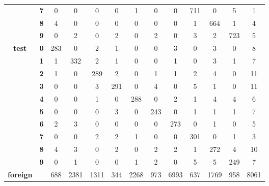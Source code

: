 \begin{table}[htp]
{\begin{tabular}{|c|c|c|c|c|c|c|c|c|c|c|c|c|}
		& \textbf{7} & 0          & 0          & 0          & 0          & 1          & 0          & 0          & 711        & 0          & 5          & 1                \\ \cline{2-13} 
		& \textbf{8} & 4          & 0          & 0          & 0          & 0          & 0          & 0          & 1          & 664        & 1          & 4                \\ \cline{2-13} 
		& \textbf{9} & 0          & 2          & 0          & 2          & 0          & 2          & 0          & 3          & 2          & 723        & 5                \\ \hline
		\multirow{10}{*}{\textbf{test}}     & \textbf{0} & 283        & 0          & 2          & 1          & 0          & 0          & 3          & 0          & 3          & 0          & 8                \\ \cline{2-13} 
		& \textbf{1} & 1          & 332        & 2          & 1          & 0          & 0          & 1          & 0          & 3          & 1          & 7                \\ \cline{2-13} 
		& \textbf{2} & 1          & 0          & 289        & 2          & 0          & 1          & 1          & 2          & 4          & 0          & 11               \\ \cline{2-13} 
		& \textbf{3} & 0          & 0          & 3          & 291        & 0          & 4          & 0          & 5          & 1          & 0          & 11               \\ \cline{2-13} 
		& \textbf{4} & 0          & 0          & 1          & 0          & 288        & 0          & 2          & 1          & 4          & 4          & 6                \\ \cline{2-13} 
		& \textbf{5} & 0          & 0          & 0          & 3          & 0          & 243        & 0          & 1          & 1          & 1          & 7                \\ \cline{2-13} 
		& \textbf{6} & 2          & 3          & 0          & 0          & 0          & 0          & 273        & 0          & 1          & 0          & 5                \\ \cline{2-13} 
		& \textbf{7} & 0          & 0          & 2          & 2          & 1          & 0          & 0          & 301        & 0          & 1          & 3                \\ \cline{2-13} 
		& \textbf{8} & 4          & 3          & 0          & 2          & 0          & 2          & 2          & 1          & 272        & 4          & 10               \\ \cline{2-13} 
		& \textbf{9} & 0          & 1          & 0          & 0          & 1          & 2          & 0          & 5          & 5          & 249        & 7                \\ \hline
		\textbf{foreign}                    & \textbf{}  & 688        & 2381       & 1311       & 344        & 2268       & 973        & 6993       & 637        & 1769       & 958        & 8061             \\ \hline
	\end{tabular}
	}
\end{table}

